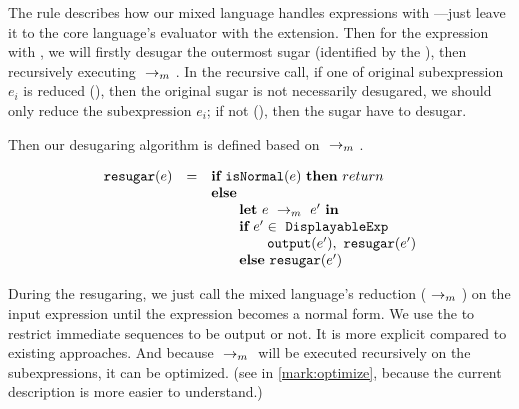 {}

{
}

The  rule describes how our mixed language handles expressions with ---just leave it to the core language's evaluator with the extension. Then for the expression with , we will firstly desugar the outermost sugar (identified by the ), then recursively executing $~\rightarrow_m~$. In the recursive call, if one of original subexpression $e_i$ is reduced (), then the original sugar is not necessarily desugared, we should only reduce the subexpression $e_i$; if not (), then the sugar have to desugar.


Then our desugaring algorithm is defined based on $~\rightarrow_m~$.

\[
\begin{array}{llll}
\mbox{\tt resugar} (e) &=& \mbox{\rm \bf if}~\mbox{\tt isNormal}(e)~\mbox{\rm \bf then}~return\\
              & & \mbox{\rm \bf else}~\\
							& & \qquad \mbox{\rm \bf let}~e ~\rightarrow_m~e'~\mbox{\rm \bf in}\\
							& & \qquad \mbox{\rm \bf if}~e' \in~\mbox{\tt DisplayableExp} \\
							& & \qquad \qquad \mbox{\tt output}(e'),~\mbox{\tt resugar}(e')\\
							& & \qquad \mbox{\rm \bf else}~\mbox{\tt resugar}(e')
\end{array}
\]

During the resugaring, we just call the mixed language's reduction ($~\rightarrow_m~$) on the input expression until the expression becomes a normal form. We use the  to restrict immediate sequences to be output or not. It is more explicit compared to existing approaches. And because $~\rightarrow_m~$ will be executed recursively on the subexpressions, it can be optimized. (see in \ref{mark:optimize}, because the current description is more easier to understand.)

